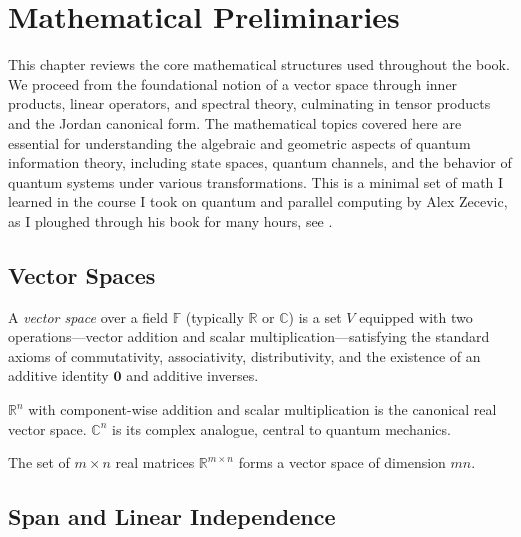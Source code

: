 \chapter{Mathematical Preliminaries}

This chapter reviews the core mathematical structures used throughout the book. We proceed from the foundational notion of a vector space through inner products, linear operators, and spectral theory, culminating in tensor products and the Jordan canonical form. The mathematical topics covered here are essential for understanding the algebraic and geometric aspects of quantum information theory, including state spaces, quantum channels, and the behavior of quantum systems under various transformations. This is a minimal set of math I learned in the course I took on quantum and parallel computing by Alex Zecevic, as I ploughed through his book for many hours, see \cite{zecevic_quantum_2022}.

\section{Vector Spaces}

A \emph{vector space} over a field $\mathbb{F}$ (typically $\mathbb{R}$ or $\mathbb{C}$) is a set $V$ equipped with two operations---vector addition and scalar multiplication---satisfying the standard axioms of commutativity, associativity, distributivity, and the existence of an additive identity $\mathbf{0}$ and additive inverses.

\begin{example}
$\mathbb{R}^n$ with component-wise addition and scalar multiplication is the canonical real vector space. $\mathbb{C}^n$ is its complex analogue, central to quantum mechanics.
\end{example}

\begin{example}
The set of $m\times n$ real matrices $\mathbb{R}^{m\times n}$ forms a vector space of dimension $mn$.
\end{example}

\section{Span and Linear Independence}

